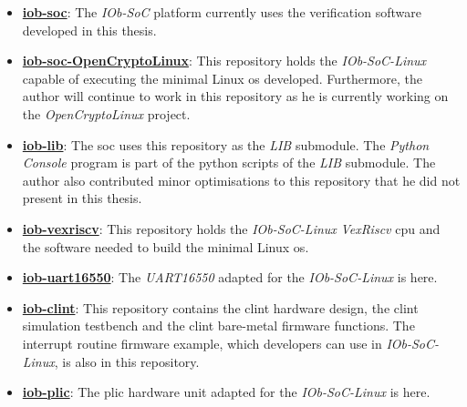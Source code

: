 \begin{itemize}
    \item \href{https://github.com/IObundle/iob-soc}{\textbf{iob-soc}}: The \textit{IOb-SoC} platform currently uses the verification software developed in this thesis.
    \item \href{https://github.com/IObundle/iob-soc-opencryptolinux}{\textbf{iob-soc-OpenCryptoLinux}}: This repository holds the \textit{IOb-SoC-Linux} capable of executing the minimal Linux \acrshort{os} developed. Furthermore, the author will continue to work in this repository as he is currently working on the \textit{OpenCryptoLinux} project.
    \item \href{https://github.com/IObundle/iob-lib}{\textbf{iob-lib}}: The \acrshort{soc} uses this repository as the \textit{LIB} submodule. The \textit{Python} \textit{Console} program is part of the python scripts of the \textit{LIB} submodule. The author also contributed minor optimisations to this repository that he did not present in this thesis.
    \item \href{https://github.com/IObundle/iob-vexriscv}{\textbf{iob-vexriscv}}: This repository holds the \textit{IOb-SoC-Linux} \textit{VexRiscv} \acrshort{cpu} and the software needed to build the minimal Linux \acrshort{os}.
    \item \href{https://github.com/IObundle/iob-uart16550}{\textbf{iob-uart16550}}: The \textit{UART16550} adapted for the \textit{IOb-SoC-Linux} is here.
    \item \href{https://github.com/IObundle/iob-clint}{\textbf{iob-clint}}: This repository contains the \acrshort{clint} hardware design, the \acrshort{clint} simulation testbench and the \acrshort{clint} bare-metal firmware functions. The interrupt routine firmware example, which developers can use in \textit{IOb-SoC-Linux}, is also in this repository.
    \item \href{https://github.com/IObundle/iob-plic}{\textbf{iob-plic}}: The \acrshort{plic} hardware unit adapted for the \textit{IOb-SoC-Linux} is here.
\end{itemize}

